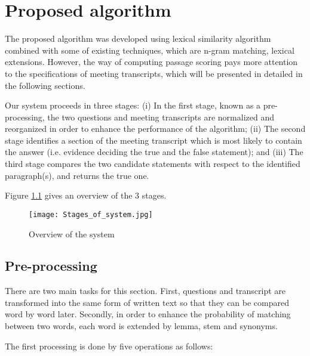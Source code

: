 \chapter{Proposed algorithm}


The proposed algorithm was developed using lexical similarity algorithm combined with some of existing techniques, which are n-gram matching, lexical extensions. However, the way of computing passage scoring pays more attention to the specifications of meeting transcripts, which will be presented in detailed in the following sections.

Our system proceeds in three stages: (i) In the first stage, known as a pre-processing, the two questions and meeting transcripts are normalized and reorganized in order to enhance the performance of the algorithm; (ii) The second stage identifies a section of the meeting transcript which is most likely to contain the answer (i.e. evidence deciding the true and the false statement); and (iii) The third stage compares the two candidate statements with respect to the identified paragraph(s), and returns the true one. 


Figure \ref{SystemOverview} gives an overview of the 3 stages.

\begin{figure}[htbp]
\centering
\texttt{[image: Stages\_of\_system.jpg]}
\caption{Overview of the system}\label{SystemOverview}
\end{figure}





\section{Pre-processing}
There are two main tasks for this section. First, questions and transcript are transformed into the same form of written text so that they can be compared word by word later. Secondly, in order to enhance the probability of matching between two words, each word is extended by lemma, stem and synonyms.

The first processing is done by five operations as follows:

